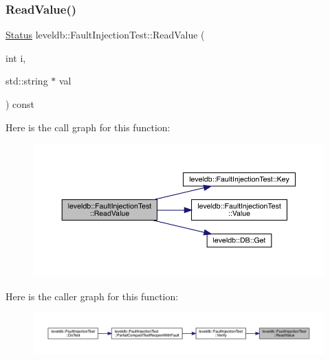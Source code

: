 \subsubsection{\texorpdfstring{ReadValue()}{ReadValue()}}
{\footnotesize\ttfamily \mbox{\hyperlink{classleveldb_1_1_status}{Status}} leveldb\+::\+Fault\+Injection\+Test\+::\+Read\+Value (\begin{DoxyParamCaption}\item[{int}]{i,  }\item[{std\+::string $\ast$}]{val }\end{DoxyParamCaption}) const\hspace{0.3cm}{\ttfamily [inline]}}

Here is the call graph for this function\+:
\nopagebreak
\begin{figure}[H]
\begin{center}
\leavevmode
\includegraphics[width=350pt]{classleveldb_1_1_fault_injection_test_a0b40c46d524ef4ddd2415039e7f100a4_cgraph}
\end{center}
\end{figure}
Here is the caller graph for this function\+:
\nopagebreak
\begin{figure}[H]
\begin{center}
\leavevmode
\includegraphics[width=350pt]{classleveldb_1_1_fault_injection_test_a0b40c46d524ef4ddd2415039e7f100a4_icgraph}
\end{center}
\end{figure}
\mbox{\label{classleveldb_1_1_fault_injection_test_a15c8b348e0d0569b2dbd5065386e7405}} 
